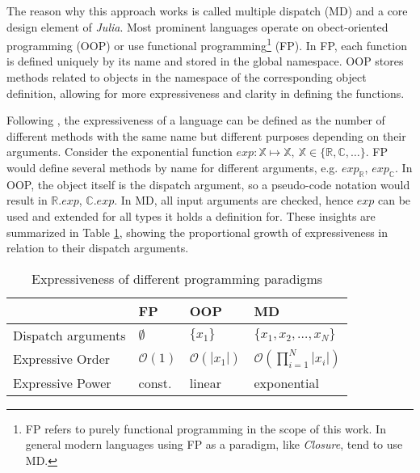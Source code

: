 

The reason why this approach works is called multiple dispatch (MD) and a core design element of \textit{Julia}. Most prominent languages operate on
obect-oriented programming (OOP) or use functional programming\footnote{FP refers to purely functional programming in the scope of this work. In general modern languages using FP as a paradigm, like \textit{Closure}, tend to use MD.} (FP).
In FP, each function is defined uniquely by its name and stored in the global namespace. OOP stores methods related to objects in the namespace
of the corresponding object definition, allowing for more expressiveness and clarity in defining the functions.

Following \cite{JMKarpinski2019}, the expressiveness of a language can be defined as the number of different methods with the same name but different purposes depending on their arguments.
Consider the exponential function $exp : \mathbb{X} \mapsto \mathbb{X},~ \mathbb{X} \in \lbrace \mathbb{R}, \mathbb{C}, \dots \rbrace$. FP would define several methods by name for different 
arguments, e.g. $exp_{\mathbb{R}}$, $exp_{\mathbb{C}}$. In OOP, the object itself is the dispatch argument, so a pseudo-code notation would result in $\mathbb{R}.exp$, $\mathbb{C}.exp$.
In MD, all input arguments are checked, hence $exp$ can be used and extended for all types it holds a definition for. These insights are summarized in Table \ref{JM:tab:ExpressivePow}, showing the proportional
growth of expressiveness in relation to their dispatch arguments. \\

\begin{table}
    \begin{tabular}{|l|l|l|l|} \hline
        & FP & OOP & MD \\ \hline
        Dispatch arguments & $\emptyset$ & $\lbrace x_1 \rbrace$ & $\lbrace x_1 , x_2, \dots, x_N \rbrace$ \\
        Expressive Order &  $\mathcal{O}\left(1\right)$ & $\mathcal{O}\left(\left|x_1\right|\right)$ &  $\mathcal{O}\left(\prod_{i=1}^N \left|x_i\right|\right)$ \\
        Expressive Power & const. & linear & exponential \\ \hline
    \end{tabular}
    \caption{Expressiveness of different programming paradigms}
    \label{JM:tab:ExpressivePow}
\end{table}

